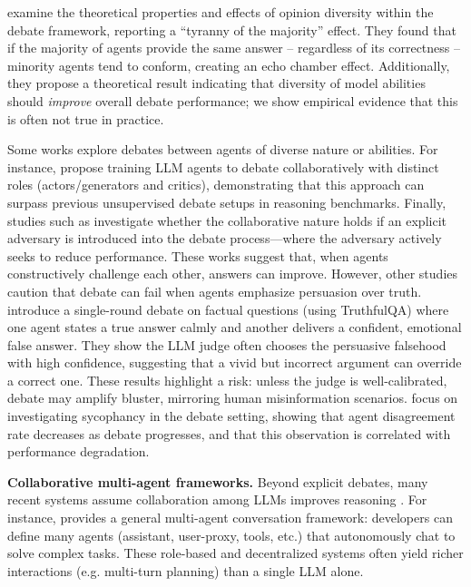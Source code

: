 \documentclass{article}
\begin{document}
\citet{estornell2024multi} examine the theoretical properties and effects of opinion diversity within the debate framework, reporting a ``tyranny of the majority'' effect. They found that if the majority of agents provide the same answer -- regardless of its correctness -- minority agents tend to conform, creating an echo chamber effect. Additionally, they propose a theoretical result indicating that diversity of model abilities should \textit{improve} overall debate performance; we show empirical evidence that this is often not true in practice. 

Some works explore debates between agents of diverse nature or abilities. For instance,  \citet{estornell2025acccollabactorcriticapproachmultiagent, subramaniam2025multiagent} propose training LLM agents to debate collaboratively with distinct roles (actors/generators and critics), demonstrating that this approach can surpass previous unsupervised debate setups in reasoning benchmarks.
Finally, studies such as \citet{amayuelas2024multiagent} investigate whether the collaborative nature holds if an explicit adversary is introduced into the debate process—where the adversary actively seeks to reduce performance. These works suggest that, when agents constructively challenge each other, answers can improve.
However, other studies caution that debate can fail when agents emphasize persuasion over truth. \citet{agarwal2025persuasionoverridestruthmultiagent} introduce a single-round debate on factual questions (using TruthfulQA) where one agent states a true answer calmly and another delivers a confident, emotional false answer. They show the LLM judge often chooses the persuasive falsehood with high confidence, suggesting that a vivid but incorrect argument can override a correct one. These results highlight a risk: unless the judge is well-calibrated, debate may amplify bluster, mirroring human misinformation scenarios.
\citet{yao2025peacemakertroublemakersycophancyshapes} focus on investigating sycophancy in the debate setting, showing that agent disagreement rate decreases as debate progresses, and that this observation is correlated with performance degradation. 

\textbf{Collaborative multi-agent frameworks.} Beyond explicit debates, many recent systems assume collaboration among LLMs improves reasoning \citep{li2023camelcommunicativeagentsmind, wang2024mixture, tran2025multi}. For instance, \citet{wu2023autogenenablingnextgenllm} provides a general multi-agent conversation framework: developers can define many agents (assistant, user-proxy, tools, etc.) that autonomously chat to solve complex tasks. These role-based and decentralized systems often yield richer interactions (e.g. multi-turn planning) than a single LLM alone.
\end{document}
